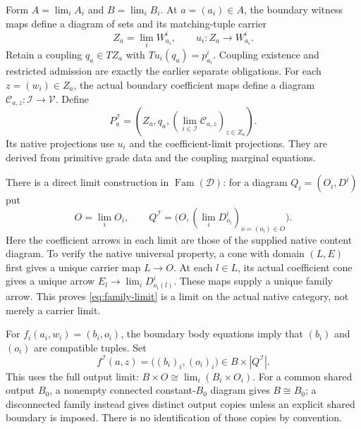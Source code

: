 \documentclass[11pt]{article}
\begin{document}
Form $A=\lim_i A_i$ and $B=\lim_i B_i$. At $a=(a_i)\in A$, the boundary witness maps define a diagram of sets and its matching-tuple carrier
\[
 Z_a=\lim_i W^i_{a_i},\qquad u_i:Z_a\to W^i_{a_i}.
\]
Retain a coupling $q_a\in TZ_a$ with $Tu_i(q_a)=p^i_{a_i}$. Coupling existence and restricted admission are exactly the earlier separate obligations. For each $z=(w_i)\in Z_a$, the actual boundary coefficient maps define a diagram $\mathcal C_{a,z}:\mathcal I\to\mathcal V$. Define
\[
 P^{\mathcal I}_a=(Z_a,q_a,(\lim_{i\in\mathcal I}\mathcal C_{a,z})_{z\in Z_a}). \tag{GJ}\label{eq:joint-context-grade}
\]
Its native projections use $u_i$ and the coefficient-limit projections. They are derived from primitive grade data and the coupling marginal equations.

There is a direct limit construction in $\operatorname{Fam}(\mathcal D)$: for a diagram $Q_i=(O_i,D^i)$ put
\[
 O=\lim_iO_i,\qquad
 Q^{\mathcal I}=\bigl(O,(\lim_i D^i_{o_i})_{o=(o_i)\in O}\bigr). \tag{GL}\label{eq:family-limit}
\]
Here the coefficient arrows in each limit are those of the supplied native content diagram. To verify the native universal property, a cone with domain $(L,E)$ first gives a unique carrier map $L\to O$. At each $l\in L$, its actual coefficient cone gives a unique arrow $E_l\to\lim_iD^i_{o_i(l)}$. These maps supply a unique family arrow. This proves \eqref{eq:family-limit} is a limit on the actual native category, not merely a carrier limit.

For $f_i(a_i,w_i)=(b_i,o_i)$, the boundary body equations imply that $(b_i)$ and $(o_i)$ are compatible tuples. Set
\[
 f^{\mathcal I}(a,z)=\bigl((b_i)_i,(o_i)_i\bigr)\in B\times|Q^{\mathcal I}|. \tag{GB}\label{eq:joint-body}
\]
This uses the full output limit: $B\times O\cong\lim_i(B_i\times O_i)$. For a common shared output $B_0$, a nonempty connected constant-$B_0$ diagram gives $B\cong B_0$; a disconnected family instead gives distinct output copies unless an explicit shared boundary is imposed. There is no identification of those copies by convention.
\end{document}
